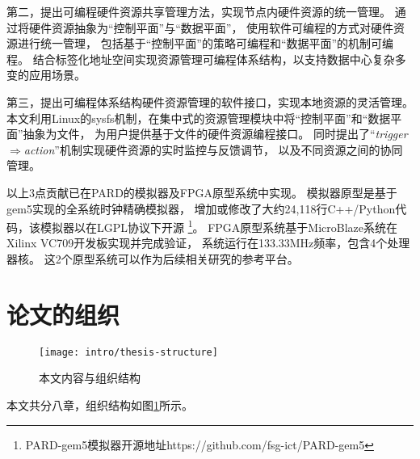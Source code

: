 第二，提出可编程硬件资源共享管理方法，实现节点内硬件资源的统一管理。
通过将硬件资源抽象为``控制平面''与``数据平面''，
使用软件可编程的方式对硬件资源进行统一管理，
包括基于``控制平面''的策略可编程和``数据平面''的机制可编程。
结合标签化地址空间实现资源管理可编程体系结构，以支持数据中心复杂多变的应用场景。


第三，提出可编程体系结构硬件资源管理的软件接口，实现本地资源的灵活管理。
本文利用Linux的sysfs机制，在集中式的资源管理模块中将``控制平面''和``数据平面''抽象为文件，
为用户提供基于文件的硬件资源编程接口。
同时提出了``\emph{trigger$\Rightarrow$action}''机制实现硬件资源的实时监控与反馈调节，
以及不同资源之间的协同管理。


以上3点贡献已在PARD的模拟器及FPGA原型系统中实现。
模拟器原型是基于gem5\cite{binkert_gem5_2011}实现的全系统时钟精确模拟器，
增加或修改了大约24,118行C++/Python代码，该模拟器以在LGPL协议下开源
\footnote{PARD-gem5模拟器开源地址https://github.com/fsg-ict/PARD-gem5}。
FPGA原型系统基于MicroBlaze系统在Xilinx VC709开发板实现并完成验证，
系统运行在133.33MHz频率，包含4个处理器核。
这2个原型系统可以作为后续相关研究的参考平台。


\section{论文的组织}

\begin{figure}[htb]
  \centering
  \texttt{[image: intro/thesis-structure]}
  \caption{本文内容与组织结构}
  \label{fig:thesis-structure}
\end{figure}

本文共分八章，组织结构如图\ref{fig:thesis-structure}所示。

